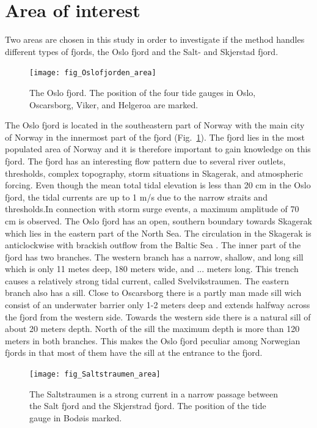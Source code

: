 \section{Area of interest}
Two areas are chosen in this study in order to investigate if the method handles different types of fjords, the Oslo fjord and the Salt- and Skjerstad fjord.

\begin{figure}[!t]
\centering
\texttt{[image: fig\_Oslofjorden\_area]}
\caption{The Oslo fjord. The position of the four tide gauges in Oslo, Oscarsborg, Viker, and Helgeroa are marked.}
\label{fig:area1}
\end{figure}

The Oslo fjord is located in the southeastern part of Norway with the main city of Norway in the innermost part of the fjord (Fig.~\ref{fig:area1}). The fjord lies in the most populated area of Norway and it is therefore important to gain knowledge on this fjord. The fjord has an interesting flow pattern due to several river outlets, thresholds, complex topography, storm situations in Skagerak, and atmospheric forcing. 
Even though the mean total tidal elevation is less than 20 cm in the Oslo fjord, the tidal currents are up to 1 m/s due to the narrow straits and thresholds.In connection with storm surge events, a maximum amplitude of 70 cm is observed. The Oslo fjord has an open, southern boundary towards Skagerak which lies in the eastern part of the North Sea. The circulation in the Skagerak is anticlockwise with brackish outflow from the Baltic Sea \cite[]{rodhe96,svendsen96}. 
The inner part of the fjord has two branches. The western branch has a narrow, shallow, and long sill which is only 11 metes deep, 180 meters wide, and ... meters long. This trench causes a relatively strong tidal current, called Svelvikstraumen. The eastern branch also has a sill. Close to Oscarsborg there is a partly man made sill wich consist of an underwater barrier only 1-2 meters deep and extends halfway across the fjord from the western side. Towards the western side there is a natural sill of about 20 meters depth. North of the sill the maximum depth is more than 120 meters in both branches.  
This makes the Oslo fjord peculiar among Norwegian fjords in that most of them
have the sill at the entrance to the fjord.

\begin{figure}[!t]
\centering
\texttt{[image: fig\_Saltstraumen\_area]}
\caption{The Saltstraumen is a strong current in a narrow passage between the Salt fjord and the Skjerstrad fjord. The position of the tide gauge in Bod\o is marked.}
\label{fig:area2}
\end{figure}

